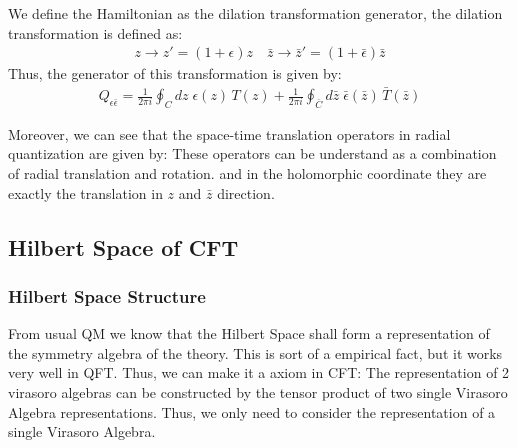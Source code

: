 We define the Hamiltonian as the dilation transformation generator,
the dilation transformation is defined as:
\begin{align}
  z\to z'=(1+\epsilon)z \quad \bar{z}\to \bar{z}'=(1+\bar\epsilon)\bar{z}
\end{align}
Thus, the generator of this transformation is given by:
\begin{align}
  Q_{\epsilon\bar{\epsilon}} = \frac{1}{2\pi i}\oint_C dz \;
  \epsilon(z) \, T(z) + \frac{1}{2\pi i}\oint_{\bar{C}} d\bar z \;
  \bar\epsilon(\bar z) \, \bar T(\bar z)
\end{align}

Moreover, we can see that the space-time translation operators in
radial quantization are given by:
These operators can be understand as a combination of radial
translation and rotation. and in the holomorphic coordinate they are
exactly the translation in $ z $ and $ \bar{z} $ direction.

\subsection{Hilbert Space of CFT}

\subsubsection{Hilbert Space Structure}

From usual QM we know that the Hilbert Space shall form a
representation of the symmetry algebra of the theory. This is sort of
a empirical fact, but it works very well in QFT. Thus, we can make it
a axiom in CFT:
The representation of 2 virasoro algebras can be constructed by the
tensor product of two single Virasoro Algebra representations. Thus,
we only need to consider the representation of a single Virasoro Algebra.

